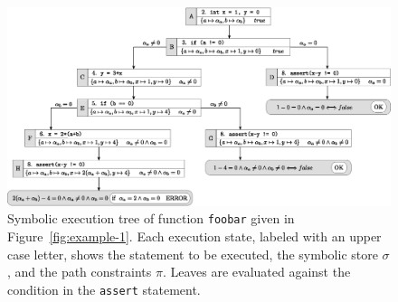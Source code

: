 

\begin{figure}[t]
  \centering
  \includegraphics[width=1.0\columnwidth]{images/execution-tree.eps} 
  \caption{Symbolic execution tree of function {\tt foobar} given in Figure~\ref{fig:example-1}. Each execution state, labeled with an upper case letter, shows the statement to be executed, the symbolic store $\sigma$, and the path constraints $\pi$. Leaves are evaluated against the condition in the {\tt assert} statement. }
  \label{fig:example-symbolic-execution}
\end{figure}

